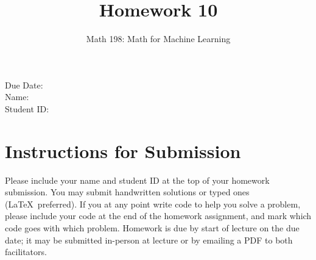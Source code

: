 \documentclass{article}
\title{Homework 10}
\author{Math 198: Math for Machine Learning}
\date{}
\begin{document}
\maketitle

\noindent
Due Date:  \\
Name: \\
Student ID:

\section*{Instructions for Submission}
Please include your name and student ID at the top of your homework submission. You may submit handwritten solutions or typed ones (\LaTeX\ preferred). If you at any point write code to help you solve a problem, please include your code at the end of the homework assignment, and mark which code goes with which problem. Homework is due by start of lecture on the due date; it may be submitted in-person at lecture or by emailing a PDF to both facilitators.
\end{document}
